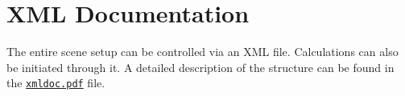 \chapter{XML Documentation }
\hypertarget{md__x_m_l}{}\label{md__x_m_l}
\label{md__x_m_l_autotoc_md19}%
%


The entire scene setup can be controlled via an XML file. Calculations can also be initiated through it. A detailed description of the structure can be found in the \href{../../latex/xmldoc.pdf}{\texttt{xmldoc.\+pdf}} file. 